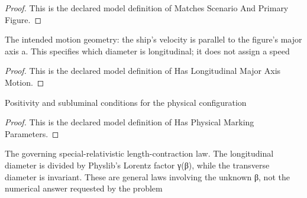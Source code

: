 \begin{proof}
  This is the declared model definition of Matches Scenario And Primary Figure.
\end{proof}
\begin{definition}
  \label{def:physics:phyx-mini-0513:phyxminiproblems-problemphyxmini0513-haslongitudinalmajoraxismotion}
  The intended motion geometry: the ship's velocity is parallel to the figure's major axis a. This specifies which diameter is longitudinal; it does not assign a speed
\end{definition}
\begin{proof}
  This is the declared model definition of Has Longitudinal Major Axis Motion.
\end{proof}
\begin{definition}
  \label{def:physics:phyx-mini-0513:phyxminiproblems-problemphyxmini0513-hasphysicalmarkingparameters}
  Positivity and subluminal conditions for the physical configuration
\end{definition}
\begin{proof}
  This is the declared model definition of Has Physical Marking Parameters.
\end{proof}
\begin{definition}
  \label{def:physics:phyx-mini-0513:phyxminiproblems-problemphyxmini0513-obeysspecialrelativisticlengthcontraction}
  The governing special-relativistic length-contraction law. The longitudinal diameter is divided by Physlib's Lorentz factor γ(β), while the transverse diameter is invariant. These are general laws involving the unknown β, not the numerical answer requested by the problem
\end{definition}
